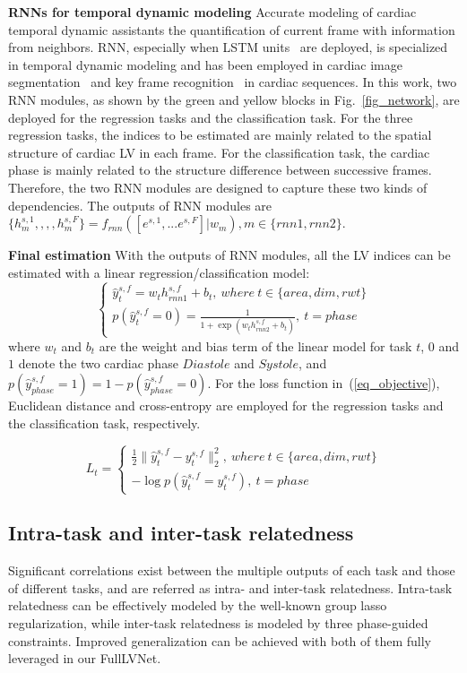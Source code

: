 \documentclass{llncs}
\begin{document}
\textbf{RNNs for temporal dynamic modeling}
Accurate modeling of cardiac temporal dynamic assistants the quantification of current frame with information from neighbors. RNN, especially when LSTM  units~\cite{graves2012supervised} are deployed, is specialized in temporal dynamic modeling and has been employed in cardiac image segmentation~\cite{poudel2016recurrent} and key frame recognition~\cite{kong2016recognizing} in cardiac sequences.
In this work, two RNN modules, as shown by the green and yellow blocks in Fig.~\ref{fig_network}, are deployed for the regression tasks and the classification task. For the three regression tasks, the indices to be estimated are mainly related to the spatial structure of cardiac LV in each frame. For the classification task, the cardiac phase is mainly related to the structure difference between successive frames. Therefore, the two RNN modules are designed to capture these two kinds of dependencies. The outputs of RNN modules are $\{h_m^{s,1},,,,h_m^{s,F}\}=f_{rnn}([e^{s,1},...e^{s,F}]|w_{m}),m\in\{rnn1,rnn2\}$.

\textbf{Final estimation} 
With the outputs of RNN modules, all the LV indices can be estimated with a linear regression/classification model:  
\begin{equation}\label{eq_linear_model}
\begin{cases}
\hat{y}_{t}^{s,f}=w_{t}h_{rnn1}^{s,f}+b_t, ~where ~t\in\{area, dim, rwt\} \\
p(\hat{y}_{t}^{s,f}=0)=\frac{1}{1+\exp(w_{t}h_{rnn2}^{s,f}+b_t)}, ~t=phase
\end{cases}
\end{equation}
where $w_{t}$ and $b_t$ are the weight and bias term of the linear model for task $t$, $0$ and $1$ denote the two cardiac phase $Diastole$ and $Systole$, and $p(\hat{y}_{phase}^{s,f}=1)=1-p(\hat{y}_{phase}^{s,f}=0)$.  
For the loss function in~(\ref{eq_objective}), Euclidean distance and cross-entropy are employed for the regression tasks and the classification task, respectively.

\begin{equation}
L_{t} = \begin{cases}
\frac{1}{2}\|\hat{y}_t^{s,f}-y_t^{s,f}\|_2^2, ~where ~t\in\{area, dim, rwt\}\\
-\log p(\hat{y}_{t}^{s,f}=y_{t}^{s,f}),~t=phase
\end{cases}
\end{equation}

\subsection{Intra-task and inter-task relatedness}
Significant correlations exist between the multiple outputs of each task and those of different tasks, and are referred as intra- and inter-task relatedness. Intra-task relatedness can be effectively modeled by the well-known group lasso regularization, while inter-task relatedness is modeled by three phase-guided constraints. Improved generalization can be achieved with both of them fully leveraged in our FullLVNet.  
\end{document}
